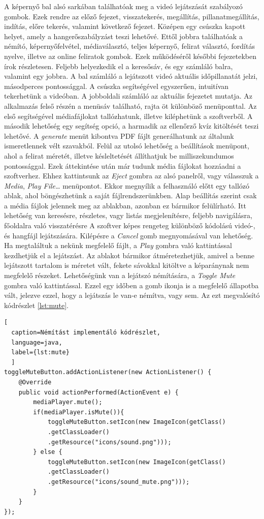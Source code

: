 A képernyő bal alsó sarkában találhatóak meg a videó lejátszását szabályozó gombok. Ezek rendre az előző fejezet, visszatekerés, megállítás, pillanatmegállítás, indítás, előre tekerés, valamint következő fejezet. Középen egy csúszka kapott helyet, amely a hangerőszabályzást teszi lehetővé. Ettől jobbra találhatóak a némító, képernyőfelvétel, médiaválasztó, teljes képernyő, felirat választó, fordítás nyelve, illetve az online feliratok gombok. Ezek működéséről későbbi fejezetekben írok részletesen. Feljebb helyezkedik el a keresősáv, és egy számláló balra, valamint egy jobbra. A bal számláló a lejátszott videó aktuális időpillanatát jelzi, másodperces pontossággal. A csúszka segítségével egyszerűen, intuitívan tekerhetünk a videóban. A jobboldali számláló az aktuális fejezetet mutatja. Az alkalmazás felső részén a menüsáv található, rajta öt különböző menüponttal. Az első segítségével médiafájlokat tallózhatunk, illetve kiléphetünk a szoftverből. A második lehetőség egy segítség opció, a harmadik az ellenőrző kvíz kitöltését teszi lehetővé. A \textit{generate} menüt kibontva PDF fájlt generálhatunk az általunk ismeretlennek vélt szavakból. Felül az utolsó lehetőség a beállítások menüpont, ahol a felirat méretét, illetve késleltetését állíthatjuk be milliszekundumos pontossággal. Ezek áttekintése után már tudunk média fájlokat hozzáadni a szoftverhez. Ehhez kattintsunk az \textit{Eject} gombra az alsó panelről, vagy válasszuk a \textit{Media}, \textit{Play File…} menüpontot. Ekkor megnyílik a felhasználó előtt egy tallózó ablak, ahol böngészhetünk a saját fájlrendszerünkben. Alap beállítás szerint csak a média fájlok jelennek meg az ablakban, azonban ez bármikor felülírható. Itt lehetőség van keresésre, részletes, vagy listás megjelenítésre, feljebb navigálásra, főoldalra való visszatérésre A szoftver képes rengeteg különböző kódolású videó-, és hangfájl lejátszására. Kilépésre a \textit{Cancel} gomb megnyomásával van lehetőség. Ha megtaláltuk a nekünk megfelelő fájlt, a \textit{Play} gombra való kattintással kezdhetjük el a lejátszást. Az ablakot bármikor átméretezhetjük, amivel a benne lejátszott tartalom is méretet vált, fekete sávokkal kitöltve a képaránynak nem megfelelő részeket. Lehetőségünk van a lejátszó némítására, a \textit{Toggle Mute} gombra való kattintással. Ezzel egy időben a gomb ikonja is a megfelelő állapotba vált, jelezve ezzel, hogy a lejátszás le van-e némítva, vagy sem. Az ezt megvalósító kódrészlet \ref{lst:mute}.

\begin{spacing}{1.25}
\begin{lstlisting}[
  caption=Némítást implementáló kódrészlet,
  language=java,
  label={lst:mute}
  ]
toggleMuteButton.addActionListener(new ActionListener() {
    @Override
    public void actionPerformed(ActionEvent e) {
        mediaPlayer.mute();
        if(mediaPlayer.isMute()){
            toggleMuteButton.setIcon(new ImageIcon(getClass()
            .getClassLoader()
            .getResource("icons/sound.png")));
        } else {
            toggleMuteButton.setIcon(new ImageIcon(getClass()
            .getClassLoader()
            .getResource("icons/sound_mute.png")));
        }
    }
});
\end{lstlisting}
\end{spacing}

